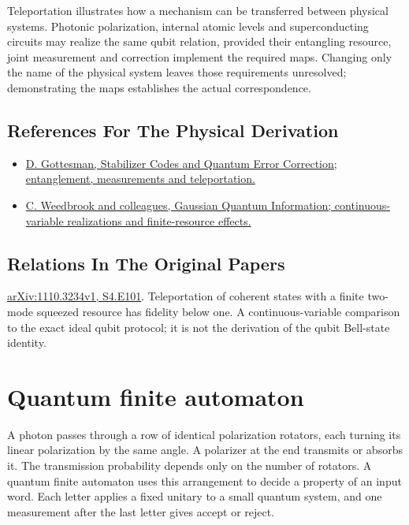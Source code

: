 \documentclass[11pt,oneside]{book}
\begin{document}
Teleportation illustrates how a mechanism can be transferred between physical systems. Photonic polarization, internal atomic levels and superconducting circuits may realize the same qubit relation, provided their entangling resource, joint measurement and correction implement the required maps. Changing only the name of the physical system leaves those requirements unresolved; demonstrating the maps establishes the actual correspondence.

\subsection*{References For The Physical Derivation}
\begin{itemize}
\item \href{https://arxiv.org/abs/quant-ph/9705052}{D. Gottesman, Stabilizer Codes and Quantum Error Correction; entanglement, measurements and teleportation.}
\item \href{https://arxiv.org/abs/1110.3234}{C. Weedbrook and colleagues, Gaussian Quantum Information; continuous-variable realizations and finite-resource effects.}
\end{itemize}

\subsection*{Relations In The Original Papers}

\href{https://arxiv.org/html/1110.3234v1#S4.E101}{arXiv:1110.3234v1, S4.E101}. Teleportation of coherent states with a finite two-mode squeezed resource has fidelity below one. A continuous-variable comparison to the exact ideal qubit protocol; it is not the derivation of the qubit Bell-state identity.



\clearpage

\section{Quantum finite automaton}

\label{topic:quantum-finite-automaton}

A photon passes through a row of identical polarization rotators, each turning its linear polarization by the same angle. A polarizer at the end transmits or absorbs it. The transmission probability depends only on the number of rotators. A quantum finite automaton uses this arrangement to decide a property of an input word. Each letter applies a fixed unitary to a small quantum system, and one measurement after the last letter gives accept or reject.
\end{document}
